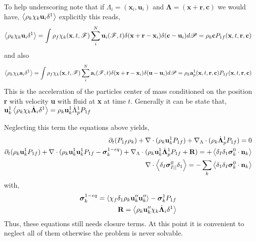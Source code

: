 \documentclass[11pt]{My_preprint}
\begin{document}
To help underscoring note that if $\Lambda_i = (\textbf{x}_i,\textbf{u}_i)$ and $\bm\Lambda = (\textbf{x}+\textbf{r},\textbf{c})$ we would have, $\left<\rho_k  \chi_k \textbf{u}_i \delta^1\right>$ explicitly this reads, 
\begin{equation}
    \left<\rho_k  \chi_k \textbf{u}_i \delta^1\right>
    = \int 
    \rho_f \chi_k(\textbf{x},t,\mathscr{F})
    \sum_i^N \textbf{u}_i(\mathscr{F},t) 
    \delta(\textbf{x}+\textbf{r}-\textbf{x}_i)
    \delta(\textbf{c}-\textbf{u}_i)
    d\mathscr{P}
    = 
    \rho_k \textbf{c}
    P_{1f}(\textbf{x},t,\textbf{r},\textbf{c})
\end{equation}
and also 
\begin{equation}
    \left<\rho_k  \chi_k \textbf{a}_i \delta^1\right>
    = \int 
    \rho_f \chi_k(\textbf{x},t,\mathscr{F})
    \sum_i^N \textbf{a}_i(\mathscr{F},t) 
    \delta(\textbf{x}+\textbf{r}-\textbf{x}_i)
    \delta(\textbf{u}-\textbf{u}_i)
    d\mathscr{P}
    = 
    \rho_k \textbf{a}_p^1(\textbf{x},t,\textbf{r},\textbf{c})
    P_{1f}(\textbf{x},t,\textbf{r},\textbf{c})
\end{equation}
This is the acceleration of the particles center of mass conditioned on the position \textbf{r} with velocity \textbf{u} with fluid at \textbf{x} at time $t$. 
Generally it can be state that, $\textbf{u}_k^1 \left<\rho_k  \chi_k \dot{\bm\Lambda}_i \delta^1\right> = \rho_k \textbf{u}_k^1 \dot{\Lambda}_p^1 P_{1f}$

Neglecting this term the equations above yields, 
\begin{align}
    \partial_t ( P_{1f} \rho_k )
    + \mathbf{\nabla}\cdot (
        \rho_k  \textbf{u}_k^1 P_{1f}
        )
    +  \mathbf{\nabla}_\Lambda \cdot ( \rho_k \dot{\bm\Lambda}_p^1 P_{1f})
    = 
    0 \\
    \partial_t (\rho_k \textbf{u}_k^1 P_{1f})
    + \mathbf{\nabla}\cdot (
         \rho_k \textbf{u}_k^1 \textbf{u}_k^1 P_{1f}
        - \bm\sigma_k^{1-eq}
        )
    +  \mathbf{\nabla}_\Lambda \cdot ( \rho_k \textbf{u}_k^1 \dot{\bm\Lambda}_p^1 P_{1f} + \textbf{R})
    = 
    + \left<\delta_I\delta_1
         \bm\sigma_k^0
    \cdot \textbf{n}_k\right>\\
        \mathbf{\nabla}\cdot \left<\delta_I \bm\sigma_{I||}^0 \delta_1 \right>
        = 
        - \sum_k\left<\delta_1
        \delta_I
        \bm\sigma_k^0
   \cdot \textbf{n}_k\right>
\end{align}
with, 
\begin{align}
    \bm\sigma_k^{1-eq}
    =
    \left<\chi_f \delta_1 \rho_k \textbf{u}''_k\textbf{u}''_k\right>
    - \bm\sigma_k^1 P_{1f}\\
    \textbf{R}
    = 
    \left<\rho_k \textbf{u}_k'' \chi_k \dot{\bm\Lambda}_i \delta^1\right>
\end{align}
Thus, these equations still needs closure terms. 
At this point it is convenient to neglect all of them otherwise the problem is never solvable. 
\end{document}
